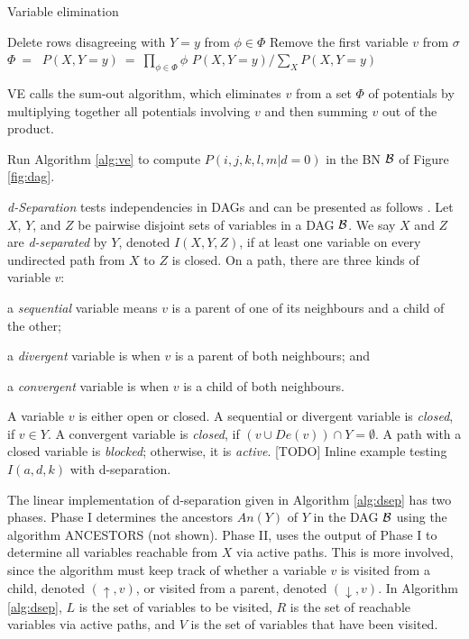 \begin{algorithm}
\caption{Variable elimination}
\label{alg:ve}
\begin{algorithmic}[1]
    \State Delete rows disagreeing with $Y=y$ from $\phi \in \Phi$ \label{alg:ve_delete}
     \label{alg:ve_while}
        \State Remove the first variable $v$ from $\sigma$
        \State $\Phi$$ ~=~$ 
    \EndWhile \label{alg:ve_end_while}
    \State $P(X,Y=y) ~=~ \prod_{\phi \in \Phi} \phi$ \label{alg:ve_posterior}
    \Return $P(X,Y=y) / \sum_X P(X,Y=y)$ \label{alg:ve_return}
\EndFunction
\end{algorithmic}
\end{algorithm}

VE calls the sum-out algorithm, which eliminates $v$ from a set $\Phi$ of potentials by multiplying together all potentials involving $v$ and then summing $v$ out of the product.

\begin{example}
Run Algorithm \ref{alg:ve} to compute $P(i,j,k,l,m | d=0)$ in the BN ${\cal B}$ of Figure \ref{fig:dag}.
\end{example}

\emph{d-Separation} \cite{pear88} tests independencies in DAGs and can be presented as follows \cite{darwiche09}.
Let $X$, $Y$, and $Z$ be pairwise disjoint sets of variables in a DAG ${\cal B}$.
We say $X$ and $Z$ are \emph{d-separated} by $Y$, denoted $I(X,Y,Z)$, if at least one variable on every undirected path from $X$ to $Z$ is closed.
On a path, there are three kinds of variable $v$:
\begin{inparaenum}[(i)]
	\item a \emph{sequential} variable means $v$ is a parent of one of its neighbours and a child of the other;
	\item a \emph{divergent} variable is when $v$ is a parent of both neighbours; and
	\item a \emph{convergent} variable is when $v$ is a child of both neighbours.
\end{inparaenum}
A variable $v$ is either open or closed.
A sequential or divergent variable is \emph{closed}, if $v \in Y$.
A convergent variable is \emph{closed}, if $( v \cup De(v) ) \cap Y = \emptyset$.
A path with a closed variable is \emph{blocked}; otherwise, it is \emph{active}.
[TODO] Inline example testing $I(a,d,k)$ with d-separation.

The linear implementation of d-separation given in Algorithm \ref{alg:dsep} \cite{koll09} has two phases.
Phase I determines the ancestors $An(Y)$ of $Y$ in the DAG ${\cal B}$ using the algorithm ANCESTORS (not shown).
Phase II, uses the output of Phase I to determine all variables reachable from $X$ via active paths.
This is more involved, since the algorithm must keep track of whether a variable $v$ is visited from a child, denoted $(\uparrow,v)$, or visited from a parent, denoted $(\downarrow,v)$.
In Algorithm \ref{alg:dsep}, $L$ is the set of variables to be visited, $R$ is the set of reachable variables via active paths, and $V$ is the set of variables that have been visited.

